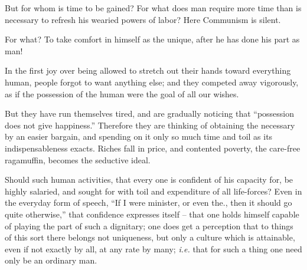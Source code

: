 But for whom is time to be gained? For what does man require more time than is 
necessary to refresh his wearied powers of labor? Here Communism is silent.

For what? To take comfort in himself as the unique, after he has done his part 
as man!

In the first joy over being allowed to stretch out their hands toward 
everything human, people forgot to want anything else; and they competed away 
vigorously, as if the possession of the human were the goal of all our wishes.

But they have run themselves tired, and are gradually noticing that 
``possession does not give happiness.'' Therefore they are thinking of 
obtaining the necessary by an easier bargain, and spending on it only so much 
time and toil as its indispensableness exacts. Riches fall in price, and 
contented poverty, the care-free ragamuffin, becomes the seductive ideal.

Should such human activities, that every one is confident of his capacity for, 
be highly salaried, and sought for with toil and expenditure of all 
life-forces? Even in the everyday form of speech, ``If I were minister, or 
even the., then it should go quite otherwise,'' that confidence expresses 
itself -- that one holds himself capable of playing the part of such a 
dignitary; one does get a perception that to things of this sort there belongs 
not uniqueness, but only a culture which is attainable, even if not exactly by 
all, at any rate by many; \textit{i.e.} that for such a thing one need only be 
an ordinary man.

